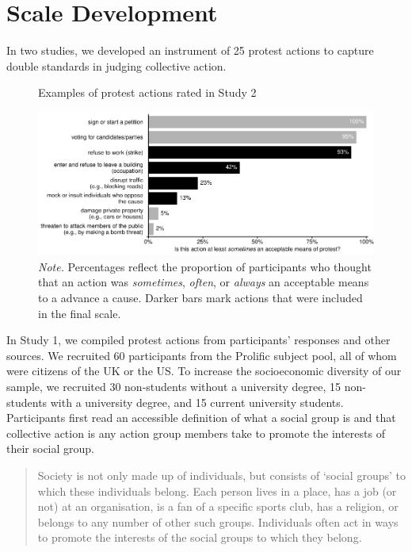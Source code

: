 \documentclass[12pt, letterpaper]{article}
\begin{document}
\hypertarget{scale-development}{%
\section{Scale Development}\label{scale-development}}

In two studies, we developed an instrument of 25 protest actions to
capture double standards in judging collective action.

\begin{figure}[!t]
\centering
\caption{Examples of protest actions rated in Study 2}
\includegraphics[scale=1]{../Scale Development/figures/figure-2}
\caption*{\textit{Note.} Percentages reflect the proportion of participants who thought that an action was \textit{sometimes}, \textit{often}, or \textit{always} an acceptable means to a advance a cause. Darker bars mark actions that were included in the final scale.}
\label{fig:f2}
\end{figure}

In Study 1, we compiled protest actions from participants' responses and
other sources. We recruited 60 participants from the Prolific subject
pool, all of whom were citizens of the UK or the US. To increase the
socioeconomic diversity of our sample, we recruited 30 non-students
without a university degree, 15 non-students with a university degree,
and 15 current university students. Participants first read an
accessible definition of what a social group is and that collective
action is any action group members take to promote the interests of
their social group.

\begin{quote}
Society is not only made up of individuals, but consists of `social
groups' to which these individuals belong. Each person lives in a place,
has a job (or not) at an organisation, is a fan of a specific sports
club, has a religion, or belongs to any number of other such groups.
Individuals often act in ways to promote the interests of the social
groups to which they belong.
\end{quote}
\end{document}
